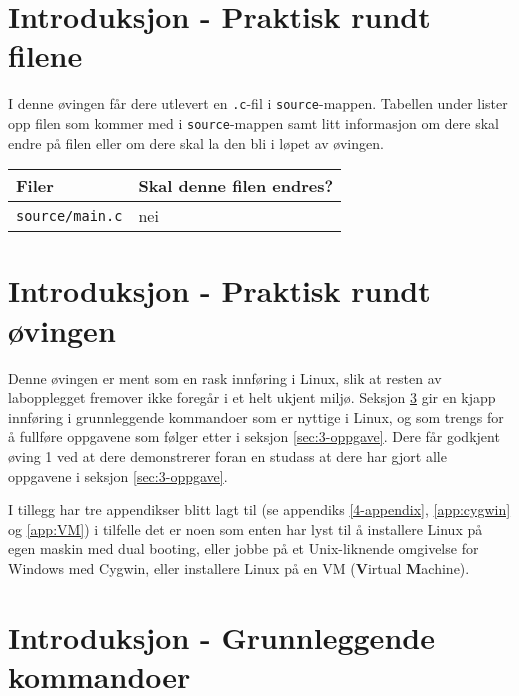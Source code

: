 \begin{alphasection}
\section{Introduksjon - Praktisk rundt filene}

I denne øvingen får dere utlevert en \verb|.c|-fil i \verb|source|-mappen. Tabellen under lister opp filen som kommer med i \verb|source|-mappen samt litt informasjon om dere skal endre på filen eller om dere skal la den bli i løpet av øvingen.

\begin{center}
 \begin{tabular}{|p{8.5cm} p{5.5cm}|} 
 \hline
 \textbf{Filer} & \textbf{Skal denne filen endres?}  \\ [0.5ex] 
 \hline\hline
  \verb|source/main.c| & nei  \\ 
 \hline
\end{tabular}
\end{center}

\section{Introduksjon - Praktisk rundt øvingen}



Denne øvingen er ment som en rask innføring i Linux, slik  at resten av labopplegget fremover ikke foregår i et helt ukjent miljø. Seksjon \ref{sec:2-innføring} gir en kjapp innføring i grunnleggende kommandoer som er nyttige i Linux, og som trengs for å fullføre oppgavene som følger etter i seksjon \ref{sec:3-oppgave}. Dere får godkjent øving 1 ved at dere demonstrerer foran en studass at dere har gjort alle oppgavene i seksjon \ref{sec:3-oppgave}. 

I tillegg har tre appendikser blitt lagt til (se appendiks \ref{4-appendix}, \ref{app:cygwin} og \ref{app:VM}) i tilfelle det er noen som enten har lyst til å installere Linux på egen maskin med dual booting, eller jobbe på et Unix-liknende omgivelse for Windows med Cygwin, eller installere Linux på en VM (\textbf{V}irtual \textbf{M}achine).






\section{Introduksjon - Grunnleggende kommandoer}\label{sec:2-innføring}


\end{alphasection}
